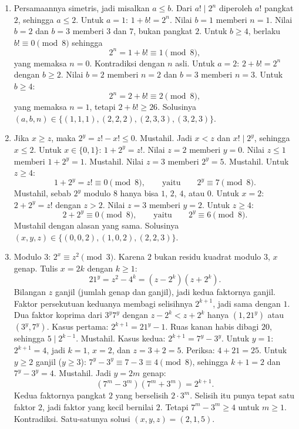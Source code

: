 \documentclass[12pt]{scrartcl}
\begin{document}
\begin{enumerate}[resume]
	\item Persamaannya simetris, jadi misalkan $a \le b$.
	Dari $a! \mid 2^n$ diperoleh $a!$ pangkat $2$, sehingga $a \le 2$.
	Untuk $a = 1$: $1 + b! = 2^n$.
	Nilai $b = 1$ memberi $n = 1$.
	Nilai $b = 2$ dan $b = 3$ memberi $3$ dan $7$, bukan pangkat $2$.
	Untuk $b \ge 4$, berlaku $b! \equiv 0 \pmod{8}$ sehingga
	\[ 2^n = 1 + b! \equiv 1 \pmod{8}, \]
	yang memaksa $n = 0$. Kontradiksi dengan $n$ asli.
	Untuk $a = 2$: $2 + b! = 2^n$ dengan $b \ge 2$.
	Nilai $b = 2$ memberi $n = 2$ dan $b = 3$ memberi $n = 3$.
	Untuk $b \ge 4$:
	\[ 2^n = 2 + b! \equiv 2 \pmod{8}, \]
	yang memaksa $n = 1$, tetapi $2 + b! \ge 26$.
	Solusinya $(a, b, n) \in \{(1, 1, 1), (2, 2, 2), (2, 3, 3), (3, 2, 3)\}$.

	\item Jika $x \ge z$, maka $2^y = z! - x! \le 0$. Mustahil.
	Jadi $x < z$ dan $x! \mid 2^y$, sehingga $x \le 2$.
	Untuk $x \in \{0, 1\}$: $1 + 2^y = z!$.
	Nilai $z = 2$ memberi $y = 0$.
	Nilai $z \le 1$ memberi $1 + 2^y = 1$. Mustahil.
	Nilai $z = 3$ memberi $2^y = 5$. Mustahil.
	Untuk $z \ge 4$:
	\[ 1 + 2^y = z! \equiv 0 \pmod{8}, \qquad \text{yaitu} \qquad 2^y \equiv 7 \pmod{8}. \]
	Mustahil, sebab $2^y$ modulo $8$ hanya bisa $1$, $2$, $4$, atau $0$.
	Untuk $x = 2$: $2 + 2^y = z!$ dengan $z > 2$.
	Nilai $z = 3$ memberi $y = 2$.
	Untuk $z \ge 4$:
	\[ 2 + 2^y \equiv 0 \pmod{8}, \qquad \text{yaitu} \qquad 2^y \equiv 6 \pmod{8}. \]
	Mustahil dengan alasan yang sama.
	Solusinya $(x, y, z) \in \{(0, 0, 2), (1, 0, 2), (2, 2, 3)\}$.

	\item Modulo $3$: $2^x \equiv z^2 \pmod{3}$.
	Karena $2$ bukan residu kuadrat modulo $3$, $x$ genap.
	Tulis $x = 2k$ dengan $k \ge 1$:
	\[ 21^y = z^2 - 4^k = (z - 2^k)(z + 2^k). \]
	Bilangan $z$ ganjil (jumlah genap dan ganjil),
	jadi kedua faktornya ganjil.
	Faktor persekutuan keduanya membagi selisihnya $2^{k+1}$,
	jadi sama dengan $1$.
	Dua faktor koprima dari $3^y7^y$ dengan $z - 2^k < z + 2^k$ hanya
	$(1, 21^y)$ atau $(3^y, 7^y)$.
	Kasus pertama: $2^{k+1} = 21^y - 1$.
	Ruas kanan habis dibagi $20$, sehingga $5 \mid 2^{k-1}$. Mustahil.
	Kasus kedua: $2^{k+1} = 7^y - 3^y$.
	Untuk $y = 1$: $2^{k+1} = 4$, jadi $k = 1$, $x = 2$, dan $z = 3 + 2 = 5$.
	Periksa: $4 + 21 = 25$.
	Untuk $y \ge 2$ ganjil ($y \ge 3$): $7^y - 3^y \equiv 7 - 3 \equiv 4 \pmod{8}$,
	sehingga $k + 1 = 2$ dan $7^y - 3^y = 4$. Mustahil.
	Jadi $y = 2m$ genap:
	\[ (7^m - 3^m)(7^m + 3^m) = 2^{k+1}. \]
	Kedua faktornya pangkat $2$ yang berselisih $2 \cdot 3^m$.
	Selisih itu punya tepat satu faktor $2$,
	jadi faktor yang kecil bernilai $2$.
	Tetapi $7^m - 3^m \ge 4$ untuk $m \ge 1$. Kontradiksi.
	Satu-satunya solusi $(x, y, z) = (2, 1, 5)$.


\end{enumerate}
\end{document}
